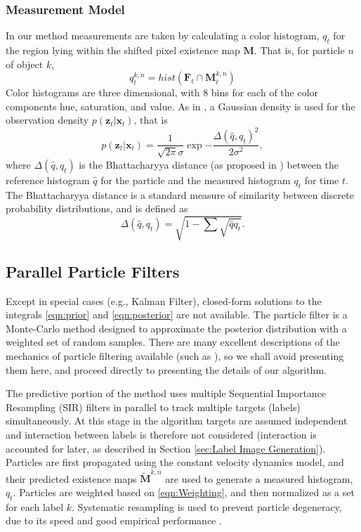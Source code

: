 \subsubsection{Measurement Model}
In our method measurements are taken by calculating a color histogram, $\mathit{q}_t$ for the region lying within the shifted pixel existence map $\mathbf{M}$. That is, for particle $n$ of object $k$,
\begin{equation}
\mathit{q}^{k,n}_t = hist( \mathbf{F}_{t} \cap \mathbf{M}^{k,n}_t )
\end{equation}
Color histograms are three dimensional, with 8 bins for each of the color components hue, saturation, and value. As in \cite{ColorBasedProbabilisticTracking}, a Gaussian density is used for the observation density $\mathit{p}(\mathbf{z}_t|\mathbf{x}_{t})$, that is
\begin{equation} 
\label{eqn:Weighting}
\mathit{p}(\mathbf{z}_t|\mathbf{x}_{t}) = \frac{1}{\sqrt{2\pi}\sigma} \exp{-\frac{\Delta(\mathit{\hat{q}},\mathit{q}_t)^2}{2\sigma^2}}, 
\end{equation}
where $\Delta(\mathit{\hat{q}},\mathit{q}_t)$ is the Bhattacharyya distance (as proposed in \cite{Real-timeTrackingMeanShift}) between the reference histogram $\mathit{\hat{q}}$ for the particle and the measured histogram $\mathit{q}_t$ for time $\mathit{t}$. The Bhattacharyya distance is a standard measure of similarity between discrete probability distributions, and is defined as
\begin{equation} \Delta(\mathit{\hat{q}},\mathit{q}_t) = \sqrt{1- \sum{\sqrt{\mathit{\hat{q}}\mathit{q}_t }}}. \end{equation}

\subsection{Parallel Particle Filters}
Except in special cases (e.g., Kalman Filter), closed-form solutions to the integrals \eqref{eqn:prior} and \eqref{eqn:posterior} are not available. The particle filter is a Monte-Carlo method designed to approximate the posterior distribution with a weighted set of random samples. There are many excellent descriptions of the mechanics of particle filtering available (such as \cite{Doucet2001}), so we shall avoid presenting them here, and proceed directly to presenting the details of our algorithm. 

The predictive portion of the method uses multiple Sequential Importance Resampling (SIR) filters in parallel to track multiple targets (labels) simultaneously. At this stage in the algorithm targets are assumed independent and interaction between labels is therefore not considered (interaction is accounted for later, as described in Section \ref{sec:Label Image Generation}). Particles are first propagated using the constant velocity dynamics model, and their predicted existence maps $\mathbf{\tilde{M}}^{k,n}$ are used to generate a measured histogram, $\mathit{q}_t$. Particles are weighted based on \eqref{eqn:Weighting}, and then normalized as a set for each label $k$. Systematic resampling is used to prevent particle degeneracy, due to its speed and good empirical performance \cite{Doucet2001}.

